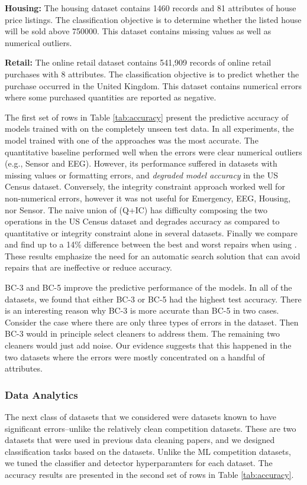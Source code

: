 \vspace{0.5em}\noindent\textbf{Housing: } The housing dataset contains 1460 records and 81 attributes of house price listings. The classification objective is to determine whether the listed house will be sold above 750000. 
This dataset contains missing values as well as numerical outliers.

\vspace{0.5em}\noindent\textbf{Retail: } The online retail dataset contains 541,909 records of online retail purchases with 8 attributes. The classification objective is to predict whether the purchase occurred in the United Kingdom.
This dataset contains numerical errors where some purchased quantities are reported as negative.


\vspace{1em}
The first set of rows in Table \ref{tab:accuracy} present the predictive accuracy of models trained with \sys on the completely unseen test data.  In all experiments, the model trained with one of the \sys  approaches was the most accurate.
The quantitative baseline performed well when the errors were clear numerical outliers (e.g., Sensor and  EEG).  However, its performance suffered in datasets with missing values or formatting errors, and {\it degraded model accuracy} in the US Census dataset.
Conversely, the integrity constraint approach worked well for non-numerical errors, however it was not useful for Emergency, EEG, Housing, nor Sensor.
The naive union of (Q+IC) has difficulty composing the two operations in the US Census dataset and degrades accuracy as compared to quantitative or integrity constraint alone in several datasets.  Finally we compare and find up to a 14\% difference between the best and worst repairs when using \sys.  These results emphasize the need for an automatic search solution that can avoid repairs that are ineffective or reduce accuracy.

BC-3 and BC-5 improve the predictive performance of the models.
In all of the datasets, we found that either BC-3 or BC-5 had the highest test accuracy.
There is an interesting reason why BC-3 is more accurate than BC-5 in two cases.
Consider the case where there are only three types of errors in the dataset.
Then BC-3 would in principle select cleaners to address them. The remaining two cleaners would just add noise.
Our evidence suggests that this happened in the two datasets where the errors were mostly concentrated on a handful of attributes.

\subsubsection{Data Analytics}
The next class of datasets that we considered were datasets known to have significant errors--unlike the relatively clean competition datasets. These are two datasets that were used in previous data cleaning papers, and we designed classification tasks based on the datasets.
Unlike the ML competition datasets, we tuned the classifier and detector hyperparamters for each dataset. 
The accuracy results are presented in the second set of rows in Table \ref{tab:accuracy}.

